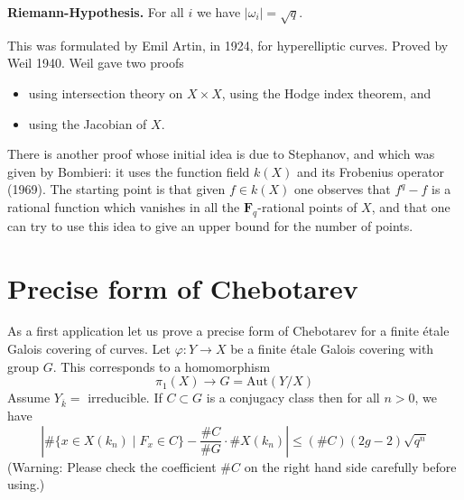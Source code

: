 \medskip\noindent
{\bf Riemann-Hypothesis.} For all $i$ we have $|\omega_i| = \sqrt{q}$.

\medskip\noindent
This was formulated by Emil Artin, in 1924, for
hyperelliptic curves. Proved by Weil 1940. Weil gave two proofs
\begin{itemize}
\item using intersection theory on $X \times X$, using the
Hodge index theorem, and
\item using the Jacobian of $X$.
\end{itemize}
There is another proof whose initial idea is due to Stephanov, and
which was given by Bombieri: it uses the function field $k(X)$ and
its Frobenius operator (1969). The starting point is that given
$f\in k(X)$ one observes that $f^q - f$ is a rational function which
vanishes in all the $\mathbf{F}_q$-rational points of $X$, and that one
can try to use this idea to give an upper bound for the number of points.

\section{Precise form of Chebotarev}
\label{trace-section-chebotarev}
As a first application let us prove a precise form of Chebotarev
for a finite \'etale Galois covering of curves.
Let $\varphi : Y \to X$ be a finite \'etale Galois covering with
group $G$. This corresponds to a homomorphism
$$
\pi_1(X) \longrightarrow G = \text{Aut}(Y/X)
$$
Assume $Y_{\overline{k}} = $ irreducible. If $C\subset G$ is a conjugacy
class then for all $n > 0$, we have
$$
| \# \{x \in X(k_n) \mid F_x \in C\} - \frac{\# C}{\# G} \cdot \# X(k_n) |
\leq
(\# C)(2g - 2) \sqrt{q^n}
$$
(Warning: Please check the coefficient $\# C$ on the right hand side
carefully before using.)

